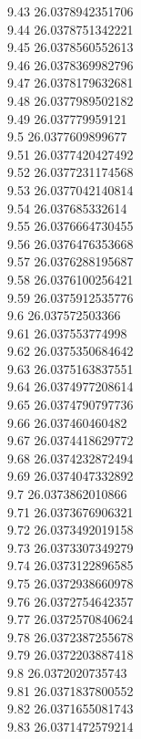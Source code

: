 {9.43	26.0378942351706\\
9.44	26.0378751342221\\
9.45	26.0378560552613\\
9.46	26.0378369982796\\
9.47	26.0378179632681\\
9.48	26.0377989502182\\
9.49	26.037779959121\\
9.5	26.0377609899677\\
9.51	26.0377420427492\\
9.52	26.0377231174568\\
9.53	26.0377042140814\\
9.54	26.037685332614\\
9.55	26.0376664730455\\
9.56	26.0376476353668\\
9.57	26.0376288195687\\
9.58	26.0376100256421\\
9.59	26.0375912535776\\
9.6	26.037572503366\\
9.61	26.037553774998\\
9.62	26.0375350684642\\
9.63	26.0375163837551\\
9.64	26.0374977208614\\
9.65	26.0374790797736\\
9.66	26.037460460482\\
9.67	26.0374418629772\\
9.68	26.0374232872494\\
9.69	26.0374047332892\\
9.7	26.0373862010866\\
9.71	26.0373676906321\\
9.72	26.0373492019158\\
9.73	26.0373307349279\\
9.74	26.0373122896585\\
9.75	26.0372938660978\\
9.76	26.0372754642357\\
9.77	26.0372570840624\\
9.78	26.0372387255678\\
9.79	26.0372203887418\\
9.8	26.0372020735743\\
9.81	26.0371837800552\\
9.82	26.0371655081743\\
9.83	26.0371472579214\\
}
